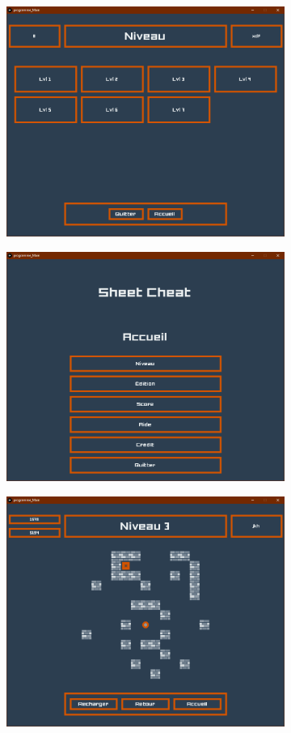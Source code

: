 \documentclass[10pt,a4paper]{article}
\begin{document}
\begin{figure}[h!]
\begin{subfigure}{.24\textwidth}
	\centering
	\includegraphics[width=.9\linewidth]{Capture1.PNG}
\end{subfigure}
\begin{subfigure}{.24\textwidth}
	\centering
	\includegraphics[width=.9\linewidth]{Capture2.PNG}
\end{subfigure}
\begin{subfigure}{.24\textwidth}
	\centering
	\includegraphics[width=.9\linewidth]{Capture3.PNG}

\end{subfigure}
\end{figure}
\end{document}
